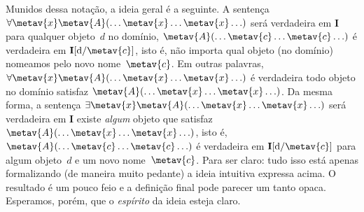 Munidos dessa notação, a ideia geral é a seguinte. A sentença
$\forall \metav{x}\metav{A}(\ldots \metav{x} \ldots \metav{x} \ldots)$
será verdadeira em $\mathbf{I}$ \ifeff{} para qualquer objeto~$d$ no domínio,
$\metav{A}(\ldots \metav{c} \ldots \metav{c}\ldots)$ é verdadeira em
$\mathbf{I}[\text{d}/\metav{c}]$, isto é, não importa qual objeto (no
domínio) nomeamos pelo novo nome~$\metav{c}$. Em outras palavras,
$\forall \metav{x} \metav{A}(\ldots \metav{x} \ldots \metav{x}
\ldots)$ é verdadeira \ifeff{} todo objeto no domínio satisfaz
$\metav{A}(\ldots \metav{x} \ldots \metav{x} \ldots)$. Da mesma forma, a
sentença $\exists \metav{x}\metav{A}(\ldots \metav{x} \ldots \metav{x}
\ldots)$ será verdadeira em $\mathbf{I}$ \ifeff{} existe \emph{algum}
objeto que satisfaz $\metav{A}(\ldots \metav{x} \ldots \metav{x}
\ldots)$, isto é, $\metav{A}(\ldots \metav{c} \ldots \metav{c} \ldots)$
é verdadeira em $\mathbf{I}[\text{d}/\metav{c}]$ para algum objeto~$d$ e um
novo nome~$\metav{c}$. 
Para ser claro: tudo isso está apenas formalizando (de maneira muito pedante) a ideia intuitiva expressa acima. O resultado é um pouco feio e a definição final pode parecer um tanto opaca. Esperamos, porém, que o \emph{espírito} da ideia esteja claro.

